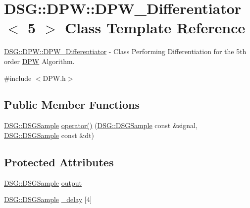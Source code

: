 \hypertarget{class_d_s_g_1_1_d_p_w_1_1_d_p_w___differentiator_3_015_01_4}{\section{D\+S\+G\+:\+:D\+P\+W\+:\+:D\+P\+W\+\_\+\+Differentiator$<$ 5 $>$ Class Template Reference}
\label{class_d_s_g_1_1_d_p_w_1_1_d_p_w___differentiator_3_015_01_4}
}


\hyperlink{class_d_s_g_1_1_d_p_w_1_1_d_p_w___differentiator}{D\+S\+G\+::\+D\+P\+W\+::\+D\+P\+W\+\_\+\+Differentiator} -\/ Class Performing Differentiation for the 5th order \hyperlink{namespace_d_s_g_1_1_d_p_w}{D\+P\+W} Algorithm.  




{\ttfamily \#include $<$D\+P\+W.\+h$>$}

\subsection*{Public Member Functions}
\begin{DoxyCompactItemize}
\item 
\hyperlink{namespace_d_s_g_ac39a94cd27ebcd9c1e7502d0c624894a}{D\+S\+G\+::\+D\+S\+G\+Sample} \hyperlink{class_d_s_g_1_1_d_p_w_1_1_d_p_w___differentiator_3_015_01_4_a58aa0475d87f841e656f725f7206fe1c}{operator()} (\hyperlink{namespace_d_s_g_ac39a94cd27ebcd9c1e7502d0c624894a}{D\+S\+G\+::\+D\+S\+G\+Sample} const \&signal, \hyperlink{namespace_d_s_g_ac39a94cd27ebcd9c1e7502d0c624894a}{D\+S\+G\+::\+D\+S\+G\+Sample} const \&dt)
\end{DoxyCompactItemize}
\subsection*{Protected Attributes}
\begin{DoxyCompactItemize}
\item 
\hyperlink{namespace_d_s_g_ac39a94cd27ebcd9c1e7502d0c624894a}{D\+S\+G\+::\+D\+S\+G\+Sample} \hyperlink{class_d_s_g_1_1_d_p_w_1_1_d_p_w___differentiator_3_015_01_4_ae69bdfd7eb71c3c44691bda6067bda0c}{output}
\item 
\hyperlink{namespace_d_s_g_ac39a94cd27ebcd9c1e7502d0c624894a}{D\+S\+G\+::\+D\+S\+G\+Sample} \hyperlink{class_d_s_g_1_1_d_p_w_1_1_d_p_w___differentiator_3_015_01_4_afc272a1eb4f3240b4148a64c7c9ccfc1}{\+\_\+delay} \mbox{[}4\mbox{]}
\end{DoxyCompactItemize}



